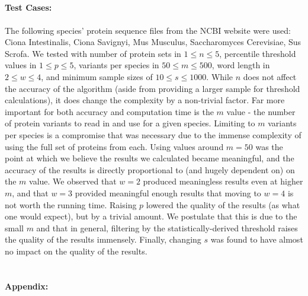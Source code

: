 \documentclass[11pt, oneside]{article}
\begin{document}
\subsection{}
\paragraph
{\bfseries Test Cases:} The following species' protein sequence files from the NCBI website were used: Ciona Intestinalis, Ciona Savignyi, Mus Musculus, Saccharomyces Cerevisiae, Sus Scrofa. We tested with number of protein sets in $1 \le n \le 5$, percentile threshold values in $1 \le p \le 5$, variants per species in $50 \le m \le 500$, word length in $2 \le w \le 4$, and minimum sample sizes of $10 \le s \le 1000$. While $n$ does not affect the accuracy of the algorithm (aside from providing a larger sample for threshold calculations), it does change the complexity by a non-trivial factor. Far more important for both accuracy and computation time is the $m$ value - the number of protein variants to read in and use for a given species. Limiting to $m$ variants per species is a compromise that was necessary due to the immense complexity of using the full set of proteins from each. Using values around $m = 50$ was the point at which we believe the results we calculated became meaningful, and the accuracy of the results is directly proportional to (and hugely dependent on) on the $m$ value. We observed that $w = 2$ produced meaningless results even at higher $m$, and that $w = 3$ provided meaningful enough results that moving to $w = 4$ is not worth the running time. Raising $p$ lowered the quality of the results (as what one would expect), but by a trivial amount. We postulate that this is due to the small $m$ and that in general, filtering by the statistically-derived threshold raises the quality of the results immensely. Finally, changing $s$ was found to have almost no impact on the quality of the results.

\pagebreak
\section{}
{\bfseries Appendix:}

\subsection{}
\end{document}
